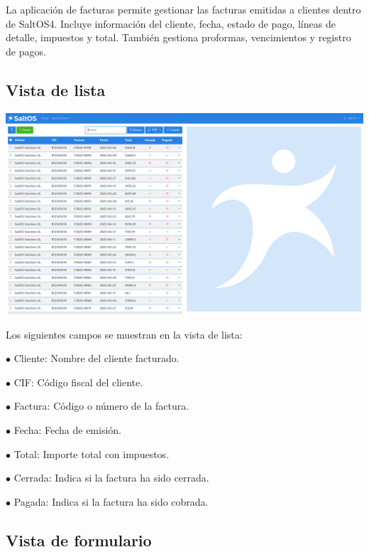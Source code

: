 \documentclass[a4paper]{article}
\begin{document}
La aplicación de facturas permite gestionar las facturas emitidas a clientes dentro de SaltOS4.
Incluye información del cliente, fecha, estado de pago, líneas de detalle, impuestos y total.
También gestiona proformas, vencimientos y registro de pagos.

\hypertarget{toc138}{}
\subsection{Vista de lista}

\begin{center}\includegraphics[width=1\textwidth]{../ujest/snaps/test-screenshots-js-screenshots-sales-invoices-list-es-es-1-snap.png}\end{center}

Los siguientes campos se muestran en la vista de lista:

\begin{compactitem}
\item[\color{myblue}$\bullet$] Cliente: Nombre del cliente facturado.
\item[\color{myblue}$\bullet$] CIF: Código fiscal del cliente.
\item[\color{myblue}$\bullet$] Factura: Código o número de la factura.
\item[\color{myblue}$\bullet$] Fecha: Fecha de emisión.
\item[\color{myblue}$\bullet$] Total: Importe total con impuestos.
\item[\color{myblue}$\bullet$] Cerrada: Indica si la factura ha sido cerrada.
\item[\color{myblue}$\bullet$] Pagada: Indica si la factura ha sido cobrada.
\end{compactitem}

\hypertarget{toc139}{}
\subsection{Vista de formulario}
\end{document}
